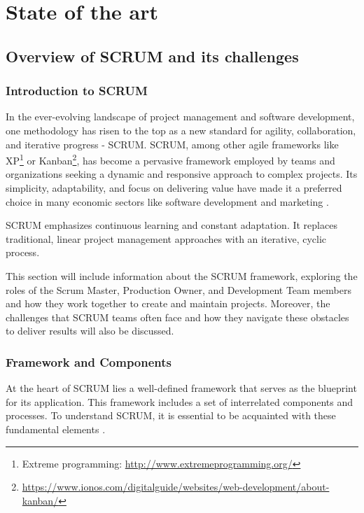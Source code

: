 \chapter{State of the art}

\label{Chapter2}

\section{Overview of SCRUM and its challenges}
\subsection{Introduction to SCRUM}

In the ever-evolving landscape of project management and software development, 
one methodology has risen to the top as a new standard for agility, collaboration, 
and iterative progress - SCRUM. SCRUM, among other agile frameworks like XP\footnote{Extreme programming: \url{http://www.extremeprogramming.org/}} or Kanban\footnote{\url{https://www.ionos.com/digitalguide/websites/web-development/about-kanban/}}, has become a pervasive framework employed by 
teams and organizations seeking a dynamic and responsive approach to complex projects. 
Its simplicity, adaptability, and focus on delivering value have made it a preferred 
choice in many economic sectors like software development 
and marketing \parencite{AgileTransformationSurvey}.

SCRUM emphasizes continuous learning and constant adaptation. 
It replaces traditional, linear project management approaches with an iterative, cyclic process. 

This section will include information about the SCRUM framework,
exploring the roles of the Scrum Master, Production Owner,
and Development Team members and how they work together to create and maintain projects. 
Moreover, the challenges that SCRUM teams often face and how they navigate these obstacles to deliver results will also be discussed. 

\subsection{Framework and Components}

At the heart of SCRUM lies a well-defined framework that serves as the blueprint for its application. This framework includes a set of interrelated components and processes. To understand SCRUM, it is essential to be acquainted with these fundamental elements \parencite{TheScrumGuide}.

